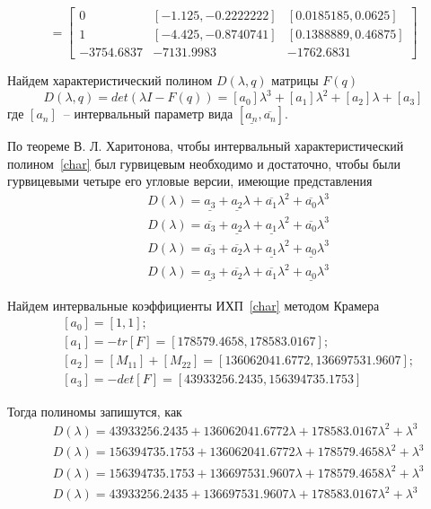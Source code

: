 \begin{equation}
	[F] = 
	\begin{bmatrix}
	0 &        [- 1.125, - 0.2222222] &       [0.0185185, 0.0625]  \\ 
	1  &       [- 4.425, - 0.8740741]  &      [0.1388889, 0.46875]  \\
	- 3754.6837 & - 7131.9983&  - 1762.6831  

	\end{bmatrix}
\end{equation}

Найдем характеристический полином $D(\lambda, q)$ матрицы $F(q)$
\begin{equation}\label{char}
	D(\lambda, q) = det(\lambda I -F(q)) = [a_0] \lambda^3 + [a_1] \lambda^2 + [a_2] \lambda + [a_3]
\end{equation}
где $[a_n]$~-- интервальный параметр вида $[\underline{a_n}, \overline{a_n}]$.

По теореме В. Л. Харитонова, чтобы интервальный характеристический полином~\ref{char}
был гурвицевым необходимо и достаточно, чтобы были гурвицевыми четыре его угловые версии, имеющие представления
\begin{align}
	&D(\lambda) = \underline{a_3} + \underline{a_2} \lambda + \overline{a_1} \lambda^2 + \overline{a_0} \lambda^3\\
	&D(\lambda) = \overline{a_3} + \underline{a_2} \lambda + \underline{a_1} \lambda^2 + \overline{a_0} \lambda^3\\
	&D(\lambda) = \overline{a_3} + \overline{a_2} \lambda + \underline{a_1} \lambda^2 + \underline{a_0} \lambda^3\\
	&D(\lambda) = \underline{a_3} + \overline{a_2} \lambda + \overline{a_1} \lambda^2 + \underline{a_0} \lambda^3
\end{align}

Найдем интервальные коэффициенты ИХП~\ref{char} методом Крамера
\begin{align}
	&[a_0] = [1,1];\\
	&[a_1] = -tr[F] = [178579.4658, 178583.0167];\\
	&[a_2] = [M_{11}] + [M_{22}] = [136062041.6772, 136697531.9607];\\
	&[a_3] = -det[F] = [43933256.2435, 156394735.1753]
\end{align}

Тогда полиномы запишутся, как 
\begin{align}
	&D(\lambda) = 43933256.2435 + 136062041.6772 \lambda + 178583.0167 \lambda^2 + \lambda^3\\
	&D(\lambda) = 156394735.1753 + 136062041.6772 \lambda + 178579.4658 \lambda^2 + \lambda^3\\
	&D(\lambda) = 156394735.1753 + 136697531.9607 \lambda + 178579.4658 \lambda^2 + \lambda^3\\
	&D(\lambda) = 43933256.2435 + 136697531.9607 \lambda + 178583.0167 \lambda^2 + \lambda^3
\end{align}

